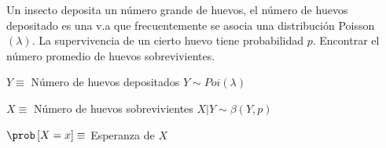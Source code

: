 \begin{Ejem} Un insecto deposita un n\'umero grande de huevos, el n\'umero de huevos depositado es una v.a que frecuentemente se asocia una distribuci\'on Poisson $\left(\lambda\right)$. La supervivencia de un cierto huevo tiene probabilidad $p$. Encontrar el n\'umero promedio de huevos sobrevivientes.

\smallskip

 $Y \equiv $ N\'umero de huevos depositados $Y \sim Poi\left(\lambda\right)$
 
 \smallskip
 
 $X \equiv $ N\'umero de huevos sobrevivientes $X|Y \sim \beta \left(Y,p\right)$
 
\smallskip

$\prob\left[X=x\right] \equiv$ Esperanza de $X$
 

\end{Ejem}
